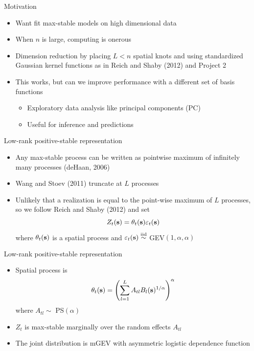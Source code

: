 \documentclass{beamer}
\begin{document}
\begin{frame}{Motivation}
	\begin{itemize} \setlength{\itemsep}{1em}
		\item Want fit max-stable models on high dimensional data
		\item When $n$ is large, computing is onerous
		\item Dimension reduction by placing $L < n$ spatial knots and using standardized Gaussian kernel functions as in Reich and Shaby (2012) and Project 2
		\item This works, but can we improve performance with a different set of basis functions \vspace{0.5em}
		\begin{itemize} \setlength{\itemsep}{0.5em}
			\item Exploratory data analysis like principal components (PC)
			\item Useful for inference and predictions
		\end{itemize}
	\end{itemize}
\end{frame}

\begin{frame}{Low-rank positive-stable representation}
	\begin{itemize} \setlength{\itemsep}{1em}
		\item Any max-stable process can be written as pointwise maximum of infinitely many processes (deHaan, 2006)
		\item Wang and Stoev (2011) truncate at $L$ processes
		\item Unlikely that a realization is equal to the point-wise maximum of $L$ processes, so we follow Reich and Shaby (2012) and set $$Z_t(\mathbf{s}) = \theta_t(\mathbf{s}) \varepsilon_t(\mathbf{s})$$ where $\theta_t(\mathbf{s})$ is a spatial process and $\varepsilon_t(\mathbf{s}) \stackrel{\mathrm{iid}}{\sim}$ GEV$(1, \alpha, \alpha)$
	\end{itemize}
\end{frame}

\begin{frame}{Low-rank positive-stable representation}
	\begin{itemize}\setlength{\itemsep}{1em}
    \item Spatial process is $$\theta_t(\mathbf{s}) = \left( \sum_{l = 1}^L A_{tl} B_l(\mathbf{s})^{1 / \alpha} \right)^\alpha$$ where $A_{tl} \sim$ PS$(\alpha)$
		\item $Z_t$ is max-stable marginally over the random effects $A_{tl}$
		\item The joint distribution is mGEV with asymmetric logistic dependence function
	\end{itemize}
\end{frame}
\end{document}
